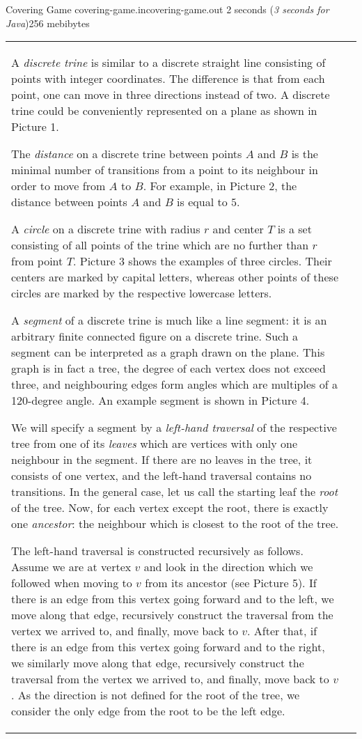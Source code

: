 \gdef\thisproblemauthor{Ivan Kazmenko}
\gdef\thisproblemdeveloper{Ivan Kazmenko}
\begin{problem}{Covering Game}
{covering-game.in}{covering-game.out}
{2 seconds (\textsl{3 seconds for Java})}{256 mebibytes}{}

\begin{tabular}{lr}
\hskip -0.2cm
\begin{minipage}{0.70\thelinewidth}
\parskip 0.2cm
A \textit{discrete trine} is similar to a discrete straight line
consisting of points with integer coordinates.
The difference is that from each point, one can move in three
directions instead of two.
A discrete trine could be conveniently represented on a plane
as shown in Picture 1.

The \textit{distance} on a discrete trine between points $A$ and $B$ is
the minimal number of transitions from a point to its neighbour
in order to move from $A$ to $B$.
For example, in Picture 2, the distance between points $A$ and $B$
is equal to $5$.

A \textit{circle} on a discrete trine with radius $r$ and center $T$ is
a set consisting of all points of the trine which are no further than $r$
from point $T$.
Picture 3 shows the examples of three circles.
Their centers are marked by capital letters, whereas other points
of these circles are marked by the respective lowercase letters.

A \textit{segment} of a discrete trine is much like a line segment:
it is an arbitrary finite connected figure on a discrete trine.
Such a segment can be interpreted as a graph drawn on the plane.
This graph is in fact a tree, the degree of each vertex does not
exceed three, and neighbouring edges form angles which are multiples
of a 120-degree angle.
An example segment is shown in Picture 4.

We will specify a segment by a \textit{left-hand traversal} of the respective
tree from one of its \textit{leaves} which are vertices with only one
neighbour in the segment.
If there are no leaves in the tree, it consists of one vertex, and
the left-hand traversal contains no transitions.
In the general case, let us call the starting leaf the \textit{root}
of the tree.
Now, for each vertex except the root, there is exactly one \textit{ancestor}:
the neighbour which is closest to the root of the tree.

The left-hand traversal is constructed recursively as follows.
Assume we are at vertex $v$ and look in the direction which we followed
when moving to $v$ from its ancestor (see Picture 5).
If there is an edge from this vertex going forward and to the left,
we move along that edge, recursively construct the traversal
from the vertex we arrived to, and finally, move back to $v$.
After that, if there is an edge from this vertex going forward and to the
right, we similarly move along that edge, recursively construct the traversal
from the vertex we arrived to, and finally, move back to $v$.
As the direction is not defined for the root of the tree,
we consider the only edge from the root to be the left edge.


\end{minipage}
\end{tabular}
\end{problem}
